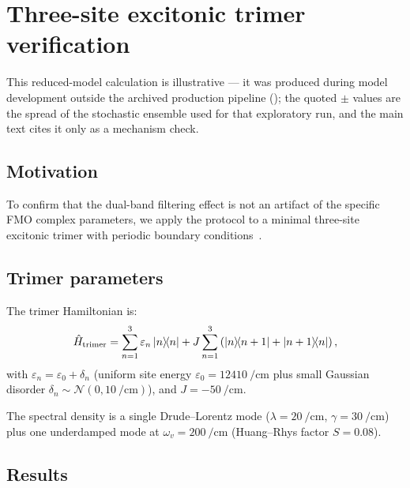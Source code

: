 \documentclass[11pt,a4paper]{article}
\begin{document}

\section{Three-site excitonic trimer verification}
\label{SI-sec:3site}

This reduced-model calculation is illustrative --- it was produced during model development outside the archived production pipeline (); the quoted $\pm$ values are the spread of the stochastic ensemble used for that exploratory run, and the main text cites it only as a mechanism check.

\subsection{Motivation}

To confirm that the dual-band filtering effect is not an artifact of the specific FMO complex parameters, we apply the protocol to a minimal three-site excitonic trimer with periodic boundary conditions~\cite{Mohseni2008,Rebentrost2009,Chin2010}.

\subsection{Trimer parameters}

The trimer Hamiltonian is:
\begin{equation}\label{eq:SI_trimer_hamiltonian}
\hat{H}_{\mathrm{trimer}} = \sum_{n=1}^{3} \varepsilon_n \dyad{n} + J \sum_{n=1}^{3} \left( \dyad{n}{n+1} + \dyad{n+1}{n} \right),
\end{equation}
with $\varepsilon_n = \varepsilon_0 + \delta_n$ (uniform site energy $\varepsilon_0 = \qty{12410}{\per\cm}$ plus small Gaussian disorder $\delta_n \sim \mathcal{N}(0, \qty{10}{\per\cm})$), and $J = \qty{-50}{\per\cm}$.

The spectral density is a single Drude--Lorentz mode ($\lambda = \qty{20}{\per\cm}$, $\gamma = \qty{30}{\per\cm}$) plus one underdamped mode at $\omega_v = \qty{200}{\per\cm}$ (Huang--Rhys factor $S = 0.08$).

\subsection{Results}
\end{document}

